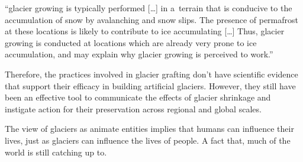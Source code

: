 \begin{thesis_quotation}

“glacier growing is typically performed […] in a terrain that is conducive to the accumulation of snow by
avalanching and snow slips. The presence of permafrost at these locations is likely to contribute to ice
accumulating […] Thus, glacier growing is conducted at locations which are already very prone to ice
accumulation, and may explain why glacier growing is perceived to work.” 

\end{thesis_quotation}

Therefore, the practices involved in glacier grafting don't have scientific evidence that support their efficacy
in building artificial glaciers. However, they still have been an effective tool to communicate the effects of
glacier shrinkage and instigate action for their preservation across regional and global scales. 


The view of glaciers as animate entities implies that humans can influence their lives, just as glaciers can
influence the lives of people. A fact that, much of the world is still catching up to.


